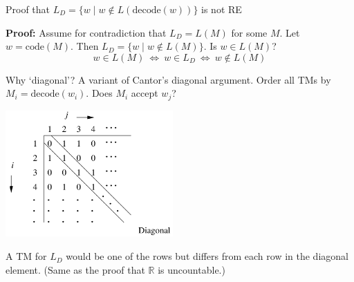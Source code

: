 \documentclass[handout]{beamer}
\begin{document}
\begin{frame}{Proof that $L_D=\{w\mid w\notin L(\mathrm{decode}(w))\}$ is not RE}

    \textbf{Proof:} Assume for contradiction that $L_D=L(M)$ for some $M$. Let $w=\mathrm{code}(M)$. Then $L_D=\{w\mid w\notin L(M)\}$. Is $w\in L(M)$?
    $$
    w\in L(M)\ \Leftrightarrow\ w\in L_D\ \Leftrightarrow\ w\notin L(M)
    $$
    
    \vspace{-24pt}
    \hfill\qedsymbol

    Why `diagonal'? A variant of Cantor's diagonal argument. Order all TMs by  $M_i=\mathrm{decode}(w_i)$. Does $M_i$ accept $w_j$?

    \vspace{-12pt}
    \begin{center}
        \includegraphics[width=0.48\textwidth]{files/diagonal.PNG}
    \end{center}
    \vspace{-15pt}
    A TM for $L_D$ would be one of the rows but differs from each row in the diagonal element. (Same as the proof that $\mathbb R$ is uncountable.)  
    
\end{frame}
\end{document}
